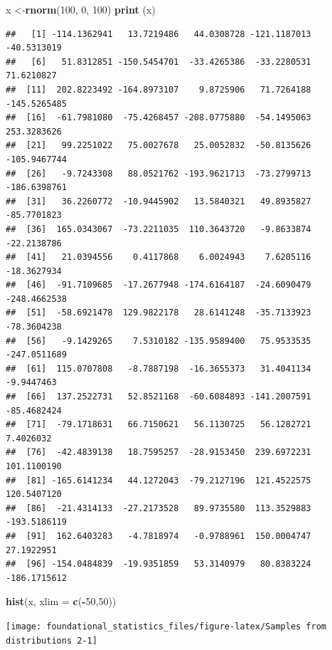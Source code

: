 \documentclass[]{book}
\newenvironment{Shaded}{\begin{snugshade}}{\end{snugshade}}
\newcommand{\DataTypeTok}[1]{\textcolor[rgb]{0.13,0.29,0.53}{#1}}
\newcommand{\DecValTok}[1]{\textcolor[rgb]{0.00,0.00,0.81}{#1}}
\newcommand{\KeywordTok}[1]{\textcolor[rgb]{0.13,0.29,0.53}{\textbf{#1}}}
\newcommand{\NormalTok}[1]{#1}
\newcommand{\OperatorTok}[1]{\textcolor[rgb]{0.81,0.36,0.00}{\textbf{#1}}}
\begin{document}
\begin{Shaded}
\begin{Highlighting}[]
\NormalTok{x <-}\KeywordTok{rnorm}\NormalTok{(}\DecValTok{100}\NormalTok{, }\DecValTok{0}\NormalTok{, }\DecValTok{100}\NormalTok{)}
\KeywordTok{print}\NormalTok{ (x)}
\end{Highlighting}
\end{Shaded}

\begin{verbatim}
##   [1] -114.1362941   13.7219486   44.0308728 -121.1187013  -40.5313019
##   [6]   51.8312851 -150.5454701  -33.4265386  -33.2280531   71.6210827
##  [11]  202.8223492 -164.8973107    9.8725906   71.7264188 -145.5265485
##  [16]  -61.7981080  -75.4268457 -208.0775880  -54.1495063  253.3283626
##  [21]   99.2251022   75.0027678   25.0052832  -50.8135626 -105.9467744
##  [26]   -9.7243308   88.0521762 -193.9621713  -73.2799713 -186.6398761
##  [31]   36.2260772  -10.9445902   13.5840321   49.8935827  -85.7701823
##  [36]  165.0343067  -73.2211035  110.3643720   -9.8633874  -22.2138786
##  [41]   21.0394556    0.4117868    6.0024943    7.6205116  -18.3627934
##  [46]  -91.7109685  -17.2677948 -174.6164187  -24.6090479 -248.4662538
##  [51]  -58.6921478  129.9822178   28.6141248  -35.7133923  -78.3604238
##  [56]   -9.1429265    7.5310182 -135.9589400   75.9533535 -247.0511689
##  [61]  115.0707808   -8.7887198  -16.3655373   31.4041134   -9.9447463
##  [66]  137.2522731   52.8521168  -60.6084893 -141.2007591  -85.4682424
##  [71]  -79.1718631   66.7150621   56.1130725   56.1282721    7.4026032
##  [76]  -42.4839138   18.7595257  -28.9153450  239.6972231  101.1100190
##  [81] -165.6141234   44.1272043  -79.2127196  121.4522575  120.5407120
##  [86]  -21.4314133  -27.2173528   89.9735580  113.3529883 -193.5186119
##  [91]  162.6403283   -4.7818974   -0.9788961  150.0004747   27.1922951
##  [96] -154.0484839  -19.9351859   53.3140979   80.8383224 -186.1715612
\end{verbatim}

\begin{Shaded}
\begin{Highlighting}[]
\KeywordTok{hist}\NormalTok{(x, }\DataTypeTok{xlim =} \KeywordTok{c}\NormalTok{(}\OperatorTok{-}\DecValTok{50}\NormalTok{,}\DecValTok{50}\NormalTok{))}
\end{Highlighting}
\end{Shaded}

\texttt{[image: foundational\_statistics\_files/figure-latex/Samples from distributions 2-1]}
\end{document}
